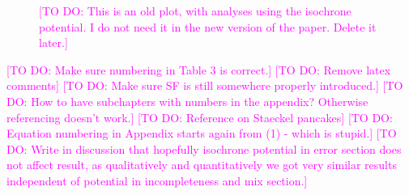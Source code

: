 \documentclass[iop,revtex4]{emulateapj}
\newcommand{\Wilma}[1]{\textcolor{Magenta}{#1}}
\newcommand{\OLD}[1]{}
\begin{document}
\begin{appendix}
\begin{figure}[!htbp]
\begin{minipage}{0.48\textwidth}
\caption{\Wilma{[TO DO: This is an old plot, with analyses using the isochrone potential. I do not need it in the new version of the paper. Delete it later.]} \OLD{Same as Figure \ref{fig:MWdhbIncompR_violins}, but without including information about the tangential velocities in the analysis. This was done by marginalizing the likelihood in Equation \eqref{eq:prob} over $v_T$ (bright grey violins; the dark grey violins are the same as in Figure \ref{fig:MWdhbIncompR_violins} for comparison). The parameter recovery is much worse than in Figure \ref{fig:MWdhbIncompR_violins}. This could indicate that much of the information about the potential is actually stored in the rotation curve, i.e., $v_T(R)$, which is not affected by removing stars from the data set. But even if we do not include $v_T$ we can still recover the potential within the errors, at least for small ($\epsilon_r \lesssim 0.15$).}} 
\label{fig:isoSphFlexIncompR_marginal_violins}
\end{minipage}
\end{figure}

\end{appendix}

\Wilma{[TO DO: Make sure numbering in Table 3 is correct.]}
\Wilma{[TO DO: Remove latex comments]}
\Wilma{[TO DO: Make sure SF is still somewhere properly introduced.]}
\Wilma{[TO DO: How to have subchapters with numbers in the appendix? Otherwise referencing doesn't work.]}
\Wilma{[TO DO: Reference on Staeckel pancakes]}
\Wilma{[TO DO: Equation numbering in Appendix starts again from (1) - which is stupid.]}
\Wilma{[TO DO: Write in discussion that hopefully isochrone potential in error section does not affect result, as qualitatively and quantitatively we got very similar results independent of potential in incompleteness and mix section.]}
\end{document}
